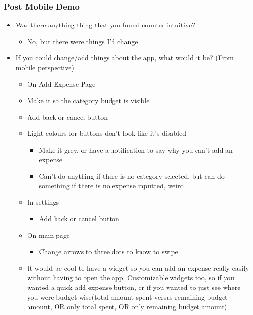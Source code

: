\documentclass{chi2011}
\begin{document}
	\subsubsection{Post Mobile Demo}
	\begin{itemize}[noitemsep]
		\item Was there anything thing that you found counter intuitive?
		\begin{itemize}[noitemsep]
			\item No, but there were things I'd change
		\end{itemize}
		\item If you could change/add things about the app, what would it be? (From mobile perspective)
		\begin{itemize}[noitemsep]
			\item On Add Expense Page
			\item Make it so the category budget is visible
			\item Add back or cancel button
			\item Light colours for buttons don't look like it's disabled
			\begin{itemize}[noitemsep]
				\item Make it grey, or have a notification to say why you can't add an expense
				\item Can't do anything if there is no category selected, but can do something if there
				  is no expense inputted, weird
			\end{itemize}
			\item In settings 
			\begin{itemize}[noitemsep]
				\item Add back or cancel button
			\end{itemize}
			\item On main page
			\begin{itemize}[noitemsep]
				\item Change arrows to three dots to know to swipe
			\end{itemize}
			\item 
				It would be cool to have a widget so you can add an expense really easily without having 
				to open the app. Customizable widgets too, so if you wanted a quick add expense button, 
				or if you wanted to just see where you were budget wise(total amount spent versus 
				remaining budget amount, OR only total spent, OR only remaining budget amount)
		\end{itemize}
	\end{itemize}
\end{document}
